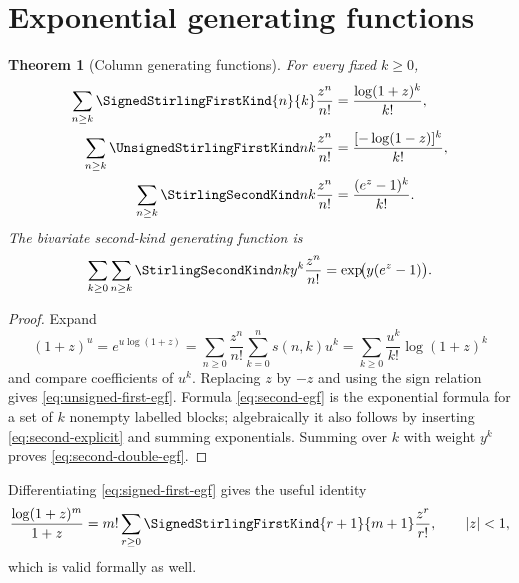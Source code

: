 \documentclass[11pt,a4paper,oneside,openany]{book}
\newtheorem{theorem}{Theorem}[chapter]
\theoremstyle{definition}
\theoremstyle{remark}
\begin{document}
\section{Exponential generating functions}
\begin{theorem}[Column generating functions]\label{thm:stirling-egfs}
For every fixed $k\ge0$,
\begin{align}
 \sum_{n\ge k}\SignedStirlingFirstKind{n}{k}\frac{z^n}{n!}
   &=\frac{\log(1+z)^k}{k!},\label{eq:signed-first-egf}\\
 \sum_{n\ge k}\UnsignedStirlingFirstKind nk\frac{z^n}{n!}
   &=\frac{[-\log(1-z)]^k}{k!},\label{eq:unsigned-first-egf}\\
 \sum_{n\ge k}\StirlingSecondKind nk\frac{z^n}{n!}
   &=\frac{(e^z-1)^k}{k!}.\label{eq:second-egf}
\end{align}
The bivariate second-kind generating function is
\begin{equation}\label{eq:second-double-egf}
 \sum_{k\ge0}\sum_{n\ge k}\StirlingSecondKind nk y^k\frac{z^n}{n!}
 =\exp\!\bigl(y(e^z-1)\bigr).
\end{equation}
\end{theorem}
\begin{proof}
Expand
\[
 (1+z)^u=e^{u\log(1+z)}
 =\sum_{n\ge0}\frac{z^n}{n!}\sum_{k=0}^ns(n,k)u^k
 =\sum_{k\ge0}\frac{u^k}{k!}\log(1+z)^k
\]
and compare coefficients of $u^k$.  Replacing $z$ by $-z$ and using the sign
relation gives \cref{eq:unsigned-first-egf}.  Formula \cref{eq:second-egf} is the
exponential formula for a set of $k$ nonempty labelled blocks; algebraically it also
follows by inserting \cref{eq:second-explicit} and summing exponentials.  Summing over
$k$ with weight $y^k$ proves \cref{eq:second-double-egf}.
\end{proof}

Differentiating \cref{eq:signed-first-egf} gives the useful identity
\begin{equation}\label{eq:log-over-one-plus}
 \frac{\log(1+z)^m}{1+z}
 =m!\sum_{r\ge0}\SignedStirlingFirstKind{r+1}{m+1}\frac{z^r}{r!},\qquad |z|<1,
\end{equation}
which is valid formally as well.
\end{document}
